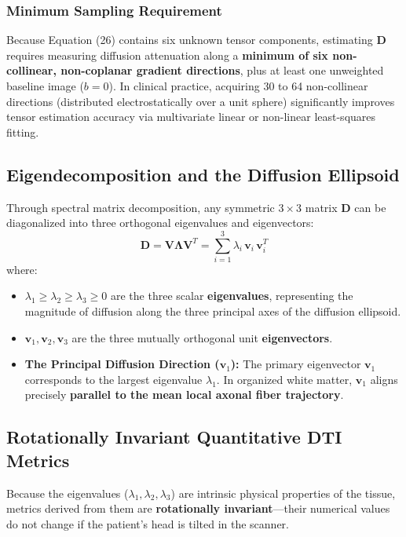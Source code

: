 \documentclass[11pt,a4paper]{article}
\begin{document}
\subsubsection{Minimum Sampling Requirement}
Because Equation (26) contains six unknown tensor components, estimating $\mathbf{D}$ requires measuring diffusion attenuation along a \textbf{minimum of six non-collinear, non-coplanar gradient directions}, plus at least one unweighted baseline image ($b = 0$). In clinical practice, acquiring 30 to 64 non-collinear directions (distributed electrostatically over a unit sphere) significantly improves tensor estimation accuracy via multivariate linear or non-linear least-squares fitting.

\subsection{Eigendecomposition and the Diffusion Ellipsoid}

Through spectral matrix decomposition, any symmetric $3 \times 3$ matrix $\mathbf{D}$ can be diagonalized into three orthogonal eigenvalues and eigenvectors:
\begin{equation}
    \mathbf{D} = \mathbf{V} \mathbf{\Lambda} \mathbf{V}^T = \sum_{i=1}^3 \lambda_i \, \mathbf{v}_i \, \mathbf{v}_i^T
\end{equation}
where:
\begin{itemize}[leftmargin=*]
    \item $\lambda_1 \ge \lambda_2 \ge \lambda_3 \ge 0$ are the three scalar \textbf{eigenvalues}, representing the magnitude of diffusion along the three principal axes of the diffusion ellipsoid.
    \item $\mathbf{v}_1, \mathbf{v}_2, \mathbf{v}_3$ are the three mutually orthogonal unit \textbf{eigenvectors}.
    \item \textbf{The Principal Diffusion Direction ($\mathbf{v}_1$):} The primary eigenvector $\mathbf{v}_1$ corresponds to the largest eigenvalue $\lambda_1$. In organized white matter, $\mathbf{v}_1$ aligns precisely \textbf{parallel to the mean local axonal fiber trajectory}.
\end{itemize}

\subsection{Rotationally Invariant Quantitative DTI Metrics}

Because the eigenvalues ($\lambda_1, \lambda_2, \lambda_3$) are intrinsic physical properties of the tissue, metrics derived from them are \textbf{rotationally invariant}—their numerical values do not change if the patient's head is tilted in the scanner.
\end{document}
